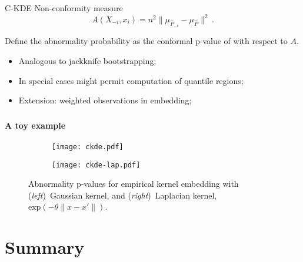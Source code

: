 \documentclass[t]{beamer}  %
\begin{document}
\begin{frame}[c]\frametitle{\insertsection}
  \framesubtitle{\insertsubsection}
  \begin{block}{C-KDE}
    Non-conformity measure
    $$ A(X_{-i}, x_i) = n^2 \| \mu_{\hat{P}_{-i}} - \mu_{\hat{P}} \|^2 \,. $$

    Define the abnormality probability as the conformal p-value of with respect
    to $A$.

    \begin{itemize}
      \item Analogous to jackknife bootstrapping;
      \item In special cases might permit computation of quantile regions;
      \item Extension: weighted observations in embedding;
    \end{itemize}
  \end{block}
\end{frame}

\begin{frame}[c]\frametitle{\insertsection}
  \framesubtitle{A toy example}
  \begin{figure}%
    \centering
    \begin{subfigure}[b]{0.45\linewidth}
      \texttt{[image: ckde.pdf]}
    \end{subfigure}%
    \begin{subfigure}[b]{0.45\linewidth}
      \texttt{[image: ckde-lap.pdf]}
    \end{subfigure}%
    \caption{Abnormality p-values for empirical kernel embedding with
    (\textit{left})~Gaussian kernel, and
    (\textit{right})~Laplacian kernel, $\text{exp}(-\theta\|x-x'\|)$.}
    \label{fig:ckde}
  \end{figure}
\end{frame}



\section{Summary} %
\label{sec:summary}
\end{document}
